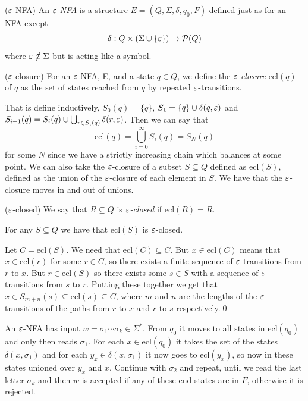 \documentclass[tikx, border = 10pt]{article}
\begin{document}
\begin{definition}
	($ \varepsilon $-NFA) An $ \varepsilon $\textit{-NFA} is a structure $ E = (Q,\Sigma, \delta, q_0, F) $ defined just as for an NFA except
	\[
		\delta: Q \times (\Sigma \cup \{\varepsilon\}) \to \mathcal P(Q)
	\]
	where $ \varepsilon\notin \Sigma $ but is acting like a symbol.
\end{definition}
\begin{definition}
	($ \varepsilon $-closure) For an $ \varepsilon $-NFA, E, and a state $ q\in Q $, we define the $ \varepsilon $\textit{-closure} $ \mathrm{ecl}(q) $ of $ q $ as the set of states reached from $ q $ by repeated $ \varepsilon $-transitions.
\end{definition}
That is define inductively, $ S_0(q) = \{q\} $, $ S_1 = \{q\} \cup \delta(q,\varepsilon) $ and $ S_{i+1} (q) = S_i(q) \cup \bigcup_{r\in S_i(q)} \delta(r,\varepsilon) $. Then we can say that
\[
	\mathrm{ecl}(q) = \bigcup_{i=0}^\infty S_i(q) = S_N(q)
\]
for some $ N $ since we have a strictly increasing chain which balances at some point. We can also take the $ \varepsilon $-closure of a subset $ S \subseteq Q $ defined as $ \mathrm{ecl}(S) $, defined as the union of the $ \varepsilon $-closure of each element in $ S $. We have that the $ \varepsilon $-closure moves in and out of unions. \par
\begin{definition}
	($ \varepsilon $-closed) We say that $ R\subseteq Q $ is $ \varepsilon $\textit{-closed} if $ \mathrm{ecl}(R) = R $.
\end{definition}
\begin{lemma}
	For any $ S\subseteq Q $ we have that $ \mathrm{ecl}(S) $ is $ \varepsilon $-closed.
\end{lemma}
\pf Let $ C = \mathrm{ecl}(S) $. We need that $ \mathrm{ecl}(C)\subseteq C $. But $ x\in \mathrm{ecl}(C) $ means that $ x\in \mathrm{ecl}(r) $ for some $ r\in C $, so there exists a finite sequence of $ \varepsilon $-transitions from $ r $ to $ x $. But $ r \in \mathrm{ecl}(S) $ so there exists some $ s\in S $ with a sequence of $ \varepsilon $-transitions from $ s $ to $ r $. Putting these together we get that $ x\in S_{m+n}(s)\subseteq \mathrm{ecl}(s)\subseteq C $, where $ m $ and $ n $ are the lengths of the $ \varepsilon $-transitions of the paths from $ r $ to $ x $ and $ r $ to $ s $ respectively.\qed 
\par
An $ \varepsilon $-NFA has input $ w=\sigma_1\cdots \sigma_k\in \Sigma^* $. From $ q_0 $ it moves to all states in $ \mathrm{ecl}(q_0) $ and only then reads $ \sigma_1 $. For each $ x\in\mathrm{ecl}(q_0) $ it takes the set of the states $ \delta(x,\sigma_1) $ and for each $ y_x\in \delta(x,\sigma_1) $ it now goes to $ \mathrm{ecl}(y_x) $, so now in these states unioned over $ y_x $ and $ x $. Continue with $ \sigma_2 $ and repeat, until we read the last letter $ \sigma_k $ and then $ w $ is accepted if any of these end states are in $ F $, otherwise it is rejected.
\end{document}
